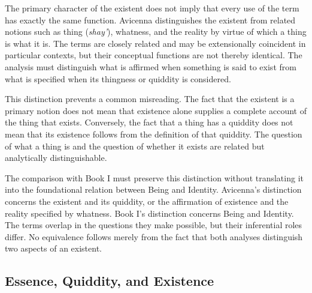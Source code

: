 \label{para:VS.B01.P01.C08.S13.SS04.P002}

The primary character of the existent
does not imply that every use of the
term has exactly the same function.
Avicenna distinguishes the existent
from related notions such as thing
(\textit{shay'}), whatness, and the
reality by virtue of which a thing
is what it is. The terms are closely
related and may be extensionally
coincident in particular contexts,
but their conceptual functions are
not thereby identical. The analysis
must distinguish what is affirmed
when something is said to exist from
what is specified when its thingness
or quiddity is considered.
\citep[Ilahiyyat, I.5]{AvicennaMetaphysics}

\label{para:VS.B01.P01.C08.S13.SS04.P003}

This distinction prevents a common
misreading. The fact that the existent
is a primary notion does not mean
that existence alone supplies a
complete account of the thing that
exists. Conversely, the fact that
a thing has a quiddity does not
mean that its existence follows
from the definition of that quiddity.
The question of what a thing is
and the question of whether it exists
are related but analytically
distinguishable.
\citep[Ilahiyyat, I.5--6]{AvicennaMetaphysics}

\label{para:VS.B01.P01.C08.S13.SS04.P004}

The comparison with Book I must
preserve this distinction without
translating it into the foundational
relation between Being and Identity.
Avicenna's distinction concerns
the existent and its quiddity,
or the affirmation of existence
and the reality specified by
whatness. Book I's distinction
concerns Being and Identity.
The terms overlap in the questions
they make possible, but their
inferential roles differ. No
equivalence follows merely from
the fact that both analyses
distinguish two aspects of an
existent.



\subsection{Essence, Quiddity, and Existence}
\label{subsec:ch08-avicenna-essence-existence}

